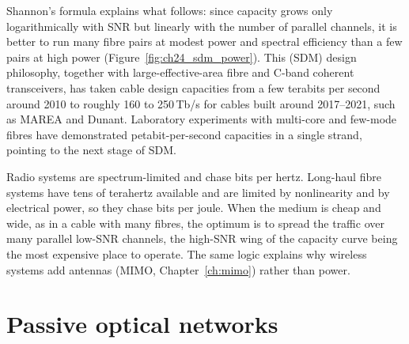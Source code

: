 
Shannon's formula explains what follows: since capacity grows only logarithmically with SNR but linearly
with the number of parallel channels, it is better to run many fibre pairs at modest power and spectral
efficiency than a few pairs at high power (Figure~\ref{fig:ch24_sdm_power}). This  (SDM) design philosophy, together with large-effective-area fibre and C-band coherent
transceivers, has taken cable design capacities from a few terabits per second around 2010 to roughly 160
to 250\,Tb/s for cables built around 2017--2021, such as MAREA and Dunant. Laboratory experiments with
multi-core and few-mode fibres have demonstrated petabit-per-second capacities in a single strand,
pointing to the next stage of SDM.



\begin{keyidea}
Radio systems are spectrum-limited and chase bits per hertz. Long-haul fibre systems have tens of terahertz
available and are limited by nonlinearity and by electrical power, so they chase bits per joule. When the
medium is cheap and wide, as in a cable with many fibres, the optimum is to spread the traffic over many
parallel low-SNR channels, the high-SNR wing of the capacity curve being the most expensive place to
operate. The same logic explains why wireless systems add antennas (MIMO, Chapter~\ref{ch:mimo}) rather than
power.
\end{keyidea}


\section{Passive optical networks}
\label{sec:ch24:pon}

